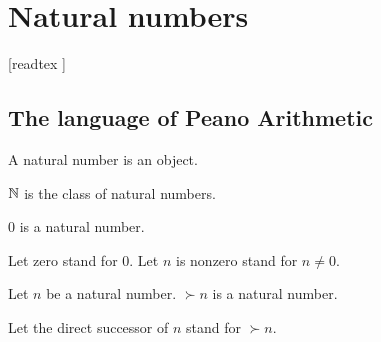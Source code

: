 \documentclass[../arithmetic.tex]{subfiles}
\begin{document}
  \chapter{Natural numbers}\label{chapter:natural-numbers}


  \begin{forthel}

    [readtex ]

  \end{forthel}


  \section{The language of Peano Arithmetic}

  \begin{forthel}
    \begin{signature}
      A natural number is an object.
    \end{signature}
  \end{forthel}

  \begin{forthel}
    \begin{definition}
      $\mathbb{N}$ is the class of natural numbers.
    \end{definition}
  \end{forthel}

  \begin{forthel}
    \begin{signature}
      $0$ is a natural number.
    \end{signature}

    Let zero stand for $0$.
    Let $n$ is nonzero stand for $n \neq 0$.
  \end{forthel}

  \begin{forthel}
    \begin{signature}
      Let $n$ be a natural number.
      $\succ{n}$ is a natural number.
    \end{signature}

    Let the direct successor of $n$ stand for $\succ{n}$.
  \end{forthel}
\end{document}

